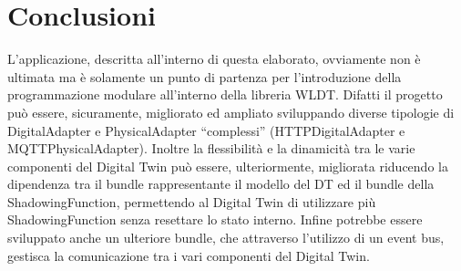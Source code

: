 \chapter{Conclusioni}

L'applicazione, descritta all'interno di questa elaborato, ovviamente non è ultimata ma è solamente un punto di partenza per l'introduzione della programmazione modulare all'interno della libreria WLDT.   Difatti il progetto può essere, sicuramente,  migliorato ed ampliato sviluppando diverse tipologie di DigitalAdapter e PhysicalAdapter “complessi” (HTTPDigitalAdapter e MQTTPhysicalAdapter). Inoltre la flessibilità e la dinamicità tra le varie componenti del Digital Twin può essere, ulteriormente, migliorata riducendo la dipendenza tra il bundle rappresentante il modello del DT ed il bundle della ShadowingFunction, permettendo al Digital Twin di utilizzare più ShadowingFunction senza resettare lo stato interno. Infine potrebbe essere sviluppato anche un ulteriore bundle, che attraverso l'utilizzo di un event bus, gestisca la comunicazione tra i vari componenti del Digital Twin.